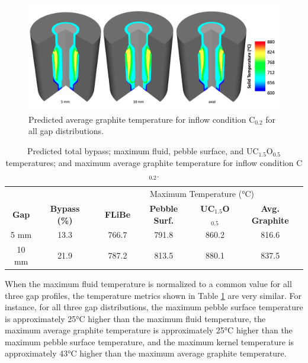 \begin{figure}[h!]
\centering
\includegraphics[height=0.4\linewidth]{figs/graphite.png}
\caption{Predicted average graphite temperature for inflow condition C$_\text{0.2}$ for all gap distributions.}
\label{fig:graphite}
\end{figure}

\begin{table}[htb!]
\caption{Predicted total bypass; maximum fluid, pebble surface, and UC$_{1.5}$O$_{0.5}$ temperatures; and maximum average graphite temperature for inflow condition C$_{0.2}$.}
\centering
\begin{tabular}{@{}c c c c c c c @{}}
\toprule
& & \phantom{a} & \multicolumn{4}{c}{Maximum Temperature (\si{\celsius})}\\
\cmidrule{4-7}
\textbf{Gap} & \textbf{Bypass (\%)} && \textbf{FLiBe} & \textbf{Pebble Surf.} & \textbf{UC$_{1.5}$O$_{0.5}$} & \textbf{Avg. Graphite}\\
\midrule
5 \si{\milli\meter} & 13.3 && 766.7 & 791.8 & 860.2 & 816.6\\
10 \si{\milli\meter} & 21.9 && 787.2 & 813.5 & 880.1 & 837.5\\
\bottomrule
\end{tabular}
\label{table:multiscale}
\end{table}

When the maximum fluid temperature is normalized to a common value for all three gap profiles, the temperature metrics shown in Table \ref{table:multiscale} are very similar. For instance, for all three gap distributions, the maximum pebble surface temperature is approximately 25\si{\celsius} higher than the maximum fluid temperature, the maximum average graphite temperature is approximately 25\si{\celsius} higher than the maximum pebble surface temperature, and the maximum kernel temperature is approximately 43\si{\celsius} higher than the maximum average graphite temperature. 

